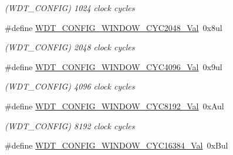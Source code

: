 \begin{DoxyCompactItemize}
\begin{DoxyCompactList}\small\item\em (W\+D\+T\+\_\+\+C\+O\+N\+F\+I\+G) 1024 clock cycles \end{DoxyCompactList}\item 
\hypertarget{group___s_a_m_l21___w_d_t_ga93691d3f0e1d8e71d7bd5aea7ac72a08}{}\#define \hyperlink{group___s_a_m_l21___w_d_t_ga93691d3f0e1d8e71d7bd5aea7ac72a08}{W\+D\+T\+\_\+\+C\+O\+N\+F\+I\+G\+\_\+\+W\+I\+N\+D\+O\+W\+\_\+\+C\+Y\+C2048\+\_\+\+Val}~0x8ul\label{group___s_a_m_l21___w_d_t_ga93691d3f0e1d8e71d7bd5aea7ac72a08}

\begin{DoxyCompactList}\small\item\em (W\+D\+T\+\_\+\+C\+O\+N\+F\+I\+G) 2048 clock cycles \end{DoxyCompactList}\item 
\hypertarget{group___s_a_m_l21___w_d_t_ga0197f2f68d745a025fc4a97540f34c62}{}\#define \hyperlink{group___s_a_m_l21___w_d_t_ga0197f2f68d745a025fc4a97540f34c62}{W\+D\+T\+\_\+\+C\+O\+N\+F\+I\+G\+\_\+\+W\+I\+N\+D\+O\+W\+\_\+\+C\+Y\+C4096\+\_\+\+Val}~0x9ul\label{group___s_a_m_l21___w_d_t_ga0197f2f68d745a025fc4a97540f34c62}

\begin{DoxyCompactList}\small\item\em (W\+D\+T\+\_\+\+C\+O\+N\+F\+I\+G) 4096 clock cycles \end{DoxyCompactList}\item 
\hypertarget{group___s_a_m_l21___w_d_t_gab3c375b315a145b56484d972888b7129}{}\#define \hyperlink{group___s_a_m_l21___w_d_t_gab3c375b315a145b56484d972888b7129}{W\+D\+T\+\_\+\+C\+O\+N\+F\+I\+G\+\_\+\+W\+I\+N\+D\+O\+W\+\_\+\+C\+Y\+C8192\+\_\+\+Val}~0x\+Aul\label{group___s_a_m_l21___w_d_t_gab3c375b315a145b56484d972888b7129}

\begin{DoxyCompactList}\small\item\em (W\+D\+T\+\_\+\+C\+O\+N\+F\+I\+G) 8192 clock cycles \end{DoxyCompactList}\item 
\hypertarget{group___s_a_m_l21___w_d_t_gac72140ef0438e63559f1bffac329d3f9}{}\#define \hyperlink{group___s_a_m_l21___w_d_t_gac72140ef0438e63559f1bffac329d3f9}{W\+D\+T\+\_\+\+C\+O\+N\+F\+I\+G\+\_\+\+W\+I\+N\+D\+O\+W\+\_\+\+C\+Y\+C16384\+\_\+\+Val}~0x\+Bul\label{group___s_a_m_l21___w_d_t_gac72140ef0438e63559f1bffac329d3f9}


\end{DoxyCompactItemize}
